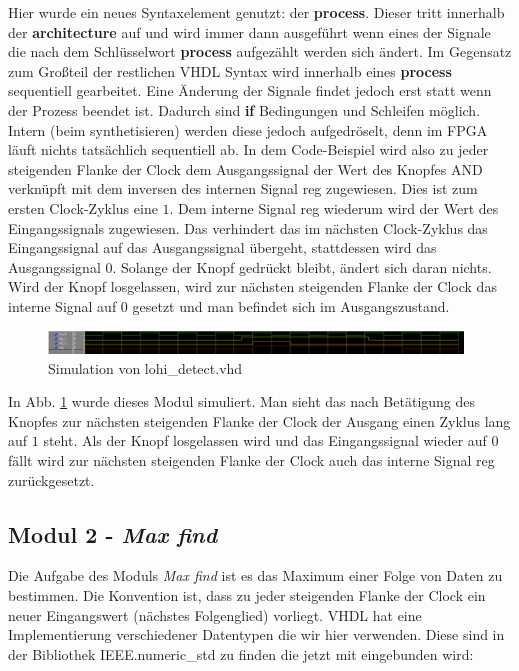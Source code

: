 

Hier wurde ein neues Syntaxelement genutzt: der \textbf{process}.
Dieser tritt innerhalb der \textbf{architecture} auf und wird immer dann ausgeführt wenn eines der Signale die nach dem Schlüsselwort \textbf{process} aufgezählt werden sich ändert.
Im Gegensatz zum Großteil der restlichen VHDL Syntax wird innerhalb eines \textbf{process} sequentiell gearbeitet.
Eine Änderung der Signale findet jedoch erst statt wenn der Prozess beendet ist.
Dadurch sind \textbf{if} Bedingungen und Schleifen möglich.
Intern (beim synthetisieren) werden diese jedoch aufgedröselt, denn im FPGA läuft nichts tatsächlich sequentiell ab.
In dem Code-Beispiel wird also zu jeder steigenden Flanke der Clock dem Ausgangssignal der Wert des Knopfes AND verknüpft mit dem inversen des internen Signal reg zugewiesen.
Dies ist zum ersten Clock-Zyklus eine $1$.
Dem interne Signal reg wiederum wird der Wert des Eingangssignals zugewiesen.
Das verhindert das im nächsten Clock-Zyklus das Eingangssignal auf das Ausgangssignal übergeht, stattdessen wird das Ausgangssignal $0$.
Solange der Knopf gedrückt bleibt, ändert sich daran nichts.
Wird der Knopf losgelassen, wird zur nächsten steigenden Flanke der Clock das interne Signal auf $0$ gesetzt und man befindet sich im Ausgangszustand.

\begin{figure}[ht]
	\centering
    \includegraphics[width=0.98\textwidth]{../Daten/lohi_detect.png}
	\caption{Simulation von lohi\_detect.vhd}
	\label{img_lohi_detect}
\end{figure}

In Abb. \ref{img_lohi_detect} wurde dieses Modul simuliert.
Man sieht das nach Betätigung des Knopfes zur nächsten steigenden Flanke der Clock der Ausgang einen Zyklus lang auf $1$ steht.
Als der Knopf losgelassen wird und das Eingangssignal wieder auf $0$ fällt wird zur nächsten steigenden Flanke der Clock auch das interne Signal reg zurückgesetzt.

\subsection{Modul 2 - \textit{Max find}}

Die Aufgabe des Moduls \textit{Max find} ist es das Maximum einer Folge von Daten zu bestimmen.
Die Konvention ist, dass zu jeder steigenden Flanke der Clock ein neuer Eingangswert (nächstes Folgenglied) vorliegt.
VHDL hat eine Implementierung verschiedener Datentypen die wir hier verwenden.
Diese sind in der Bibliothek IEEE.numeric\_std zu finden die jetzt mit eingebunden wird:

